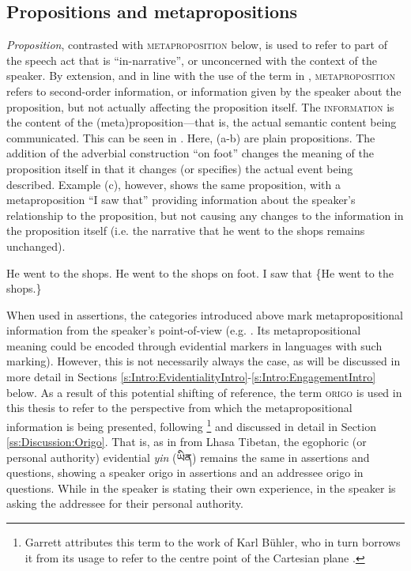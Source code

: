 \subsection{Propositions and metapropositions}
\textit{Proposition}, contrasted with \textsc{metaproposition} below, is used to refer to part of the speech act that is ``in-narrative'', or unconcerned with the context of the speaker. By extension, and in line with the use of the term in , \textsc{metaproposition} refers to second-order information, or information given by the speaker about the proposition, but not actually affecting the proposition itself. The \textsc{information} is the content of the (meta)proposition---that is, the actual semantic content being communicated. This can be seen in . Here, (a-b) are plain propositions. The addition of the adverbial construction ``on foot'' changes the meaning of the proposition itself in that it changes (or specifies) the actual event being described. Example (c), however, shows the same proposition, with a metaproposition ``I saw that'' providing information about the speaker's relationship to the proposition, but not causing any changes to the information in the proposition itself (i.e. the narrative that he went to the shops remains unchanged).

\begin{exe}
\ex \label{ex:MetapropEnglish}
\begin{xlist}
\ex He went to the shops.
\ex He went to the shops on foot.
\ex I saw that \{He went to the shops.\}\label{ex:MetapropEnglish:c}
\end{xlist}
\end{exe}

When used in assertions, the categories introduced above mark metapropositional information from the speaker's point-of-view (e.g. . Its metapropositional meaning could be encoded through evidential markers in languages with such marking). However, this is not necessarily always the case, as will be discussed in more detail in Sections \ref{s:Intro:EvidentialityIntro}-\ref{s:Intro:EngagementIntro} below. As a result of this potential shifting of reference, the term \textsc{origo} is used in this thesis to refer to the perspective from which the metapropositional information is being presented, following \footnote{Garrett attributes this term to the work of Karl Bühler, who in turn borrows it from its usage to refer to the centre point of the Cartesian plane \cite{Buehler1965}.} and discussed in detail in Section \ref{ss:Discussion:Origo}. That is, as in  from Lhasa Tibetan, the egophoric (or personal authority) evidential \textit{yin} (\foreignlanguage{tibetan}{ཡིན}) remains the same in assertions and questions, showing a speaker origo in assertions and an addressee origo in questions. While in  the speaker is stating their own experience, in  the speaker is asking the addressee for their personal authority.

